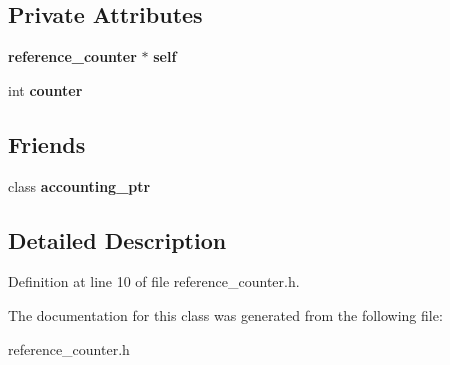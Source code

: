 \subsection*{Private Attributes}
\begin{DoxyCompactItemize}
\item 
{\bf reference\_\-counter} $\ast$ {\bfseries self}\label{classreference__counter_a8c6efecf70268743b6b1885fbe6c5db3}

\item 
int {\bfseries counter}\label{classreference__counter_a2fb8666dfcf5479be25461cbdfcbee7e}

\end{DoxyCompactItemize}
\subsection*{Friends}
\begin{DoxyCompactItemize}
\item 
class {\bf accounting\_\-ptr}\label{classreference__counter_a56b938922fd5f35053a510c4f0bd12fa}

\end{DoxyCompactItemize}


\subsection{Detailed Description}


Definition at line 10 of file reference\_\-counter.h.

The documentation for this class was generated from the following file:\begin{DoxyCompactItemize}
\item 
reference\_\-counter.h\end{DoxyCompactItemize}

